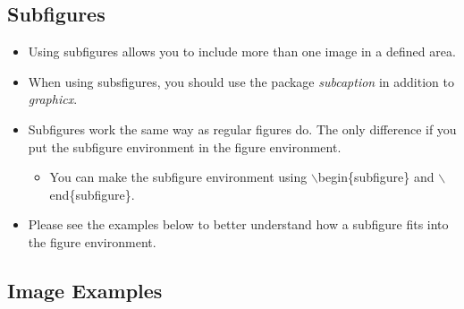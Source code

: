	\subsection{Subfigures}
		\begin{itemize}
			\item Using subfigures allows you to include more than one image in a defined area.
			\item When using subsfigures, you should use the package \textit{subcaption} in addition to \textit{graphicx}.
			\item Subfigures work the same way as regular figures do. The only difference if you put the subfigure environment in the figure environment.
			\begin{itemize}
				\item You can make the subfigure environment using $\backslash$begin\{subfigure\} and $\backslash$end\{subfigure\}.
			\end{itemize}
			\item Please see the examples below to better understand how a subfigure fits into the figure environment.
		\end{itemize}

	\newpage
	\subsection{Image Examples}
